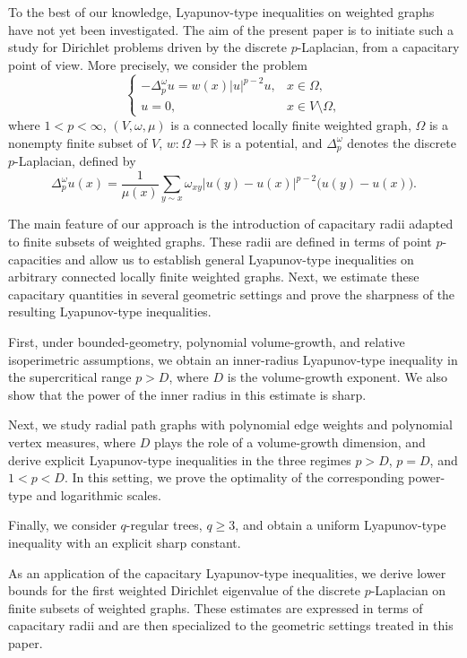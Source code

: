 \documentclass[twoside,12pt,letter]{article}
\theoremstyle{plain}
\theoremstyle{definition}
\theoremstyle{remark}
\numberwithin{equation}{section}
\begin{document}
To the best of our knowledge, Lyapunov-type inequalities on weighted graphs
have not yet been investigated. The aim of the present paper is to initiate
such a study for Dirichlet problems driven by the discrete \(p\)-Laplacian,
from a capacitary point of view. More precisely, we consider the problem
\[
\left\{
\begin{array}{ll}
-\Delta_p^\omega u=w(x)|u|^{p-2}u, & x\in\Omega,\\[2mm]
u=0, & x\in V\setminus\Omega,
\end{array}
\right.
\]
where \(1<p<\infty\), \((V,\omega,\mu)\) is a connected locally finite
weighted graph, \(\Omega\) is a nonempty finite subset of \(V\),
\(w:\Omega\to\mathbb R\) is a potential, and \(\Delta_p^\omega\) denotes the
discrete \(p\)-Laplacian, defined by
\[
\Delta_p^\omega u(x)
=
\frac{1}{\mu(x)}
\sum_{y\sim x}
\omega_{xy}|u(y)-u(x)|^{p-2}\bigl(u(y)-u(x)\bigr).
\]

The main feature of our approach is the introduction of capacitary radii
adapted to finite subsets of weighted graphs. These radii are defined in terms
of point \(p\)-capacities and allow us to establish general Lyapunov-type
inequalities on arbitrary connected locally finite weighted graphs.
Next, we estimate these capacitary quantities in several geometric settings and
prove the sharpness of the resulting Lyapunov-type inequalities. 

First, under
bounded-geometry, polynomial volume-growth, and relative isoperimetric
assumptions, we obtain an inner-radius Lyapunov-type inequality in the
supercritical range \(p>D\), where \(D\) is the volume-growth exponent. We also
show that the power of the inner radius in this estimate is sharp. 

Next, we study radial path graphs with polynomial edge weights and polynomial
vertex measures, where \(D\) plays the role of a volume-growth dimension, and
derive explicit Lyapunov-type inequalities in the three regimes \(p>D\),
\(p=D\), and \(1<p<D\). In this setting, we prove the optimality of the
corresponding power-type and logarithmic scales. 

Finally, we consider \(q\)-regular trees, \(q\ge3\), and obtain a uniform Lyapunov-type inequality with an explicit sharp constant.
 
As an application of the capacitary Lyapunov-type inequalities, we derive lower
bounds for the first weighted Dirichlet eigenvalue of the discrete
\(p\)-Laplacian on finite subsets of weighted graphs. These estimates are
expressed in terms of capacitary radii and are then specialized to the
geometric settings treated in this paper.
\end{document}
